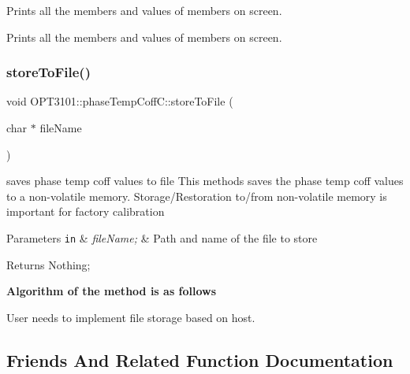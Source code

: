 \begin{DoxyItemize}
\item Prints all the members and values of members on screen. ~\newline

\item Prints all the members and values of members on screen. 
\end{DoxyItemize}\mbox{\label{class_o_p_t3101_1_1phase_temp_coff_c_a05f0376e59830c4c81b37dc2042237e6}} 
\subsubsection{\texorpdfstring{store\+To\+File()}{storeToFile()}}
{\footnotesize\ttfamily void O\+P\+T3101\+::phase\+Temp\+Coff\+C\+::store\+To\+File (\begin{DoxyParamCaption}\item[{char $\ast$}]{file\+Name }\end{DoxyParamCaption})}



saves phase temp coff values to file This methods saves the phase temp coff values to a non-\/volatile memory. Storage/\+Restoration to/from non-\/volatile memory is important for factory calibration 


\begin{DoxyParams}[1]{Parameters}
\mbox{\tt in}  & {\em file\+Name;} & Path and name of the file to store \\
\hline
\end{DoxyParams}
\begin{DoxyReturn}{Returns}
Nothing; 
\end{DoxyReturn}
{\bfseries Algorithm of the method is as follows}


\begin{DoxyItemize}
\item User needs to implement file storage based on host. 
\end{DoxyItemize}

\subsection{Friends And Related Function Documentation}
\mbox{\label{class_o_p_t3101_1_1phase_temp_coff_c_a2d7a662f1af9735bc8cae566975afbec}} 
